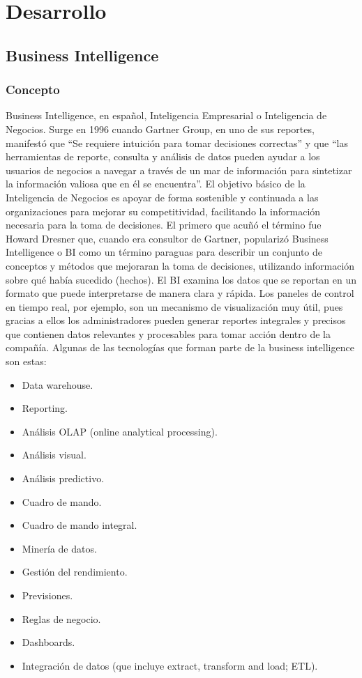 \documentclass[twoside,twocolumn]{article}
\begin{document}
\section{Desarrollo}

\subsection{Business Intelligence}
\subsubsection{Concepto}
Business Intelligence, en español, Inteligencia Empresarial o Inteligencia de Negocios. Surge en 1996 cuando Gartner Group, en uno de sus reportes, manifestó que “Se requiere intuición para tomar decisiones correctas” y que “las herramientas de reporte, consulta y análisis de datos pueden ayudar a los usuarios de negocios a navegar a través de un mar de información para sintetizar la información valiosa que en él se encuentra”. 
El objetivo básico de la Inteligencia de Negocios es apoyar de forma sostenible y continuada a las organizaciones para mejorar su competitividad, facilitando la información necesaria para la toma de decisiones. El primero que acuñó el término fue Howard Dresner que, cuando era consultor de Gartner, popularizó Business Intelligence o BI como un término paraguas para describir un conjunto de conceptos y métodos que mejoraran la toma de decisiones, utilizando información sobre qué había sucedido (hechos). El BI examina los datos que se reportan en un formato que puede interpretarse de manera clara y rápida. Los paneles de control en tiempo real, por ejemplo, son un mecanismo de visualización muy útil, pues gracias a ellos los administradores pueden generar reportes integrales y precisos que contienen datos relevantes y procesables para tomar acción dentro de la compañía.
Algunas de las tecnologías que forman parte de la business intelligence son estas:
\begin{itemize}
    \item   Data warehouse. 
    \item   Reporting. 
    \item   Análisis OLAP (online analytical processing).
    \item   Análisis visual. 
    \item   Análisis predictivo. 
    \item   Cuadro de mando. 
    \item   Cuadro de mando integral.  
    \item   Minería de datos.  
    \item   Gestión del rendimiento. 
    \item   Previsiones.
    \item   Reglas de negocio.
    \item   Dashboards.
    \item   Integración de datos (que incluye extract, transform and load; ETL).
\end{itemize}
\end{document}
